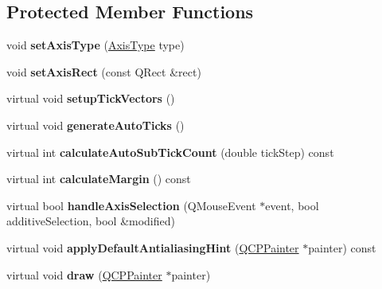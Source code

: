 \subsection*{Protected Member Functions}
\begin{DoxyCompactItemize}
\item 
\hypertarget{classQCPAxis_a3976dba7137c71a2a1a34737ff9baff9}{void {\bfseries set\-Axis\-Type} (\hyperlink{classQCPAxis_ae2bcc1728b382f10f064612b368bc18a}{Axis\-Type} type)}\label{classQCPAxis_a3976dba7137c71a2a1a34737ff9baff9}

\item 
\hypertarget{classQCPAxis_a0188c6248366fc9f9ff816dceee986e0}{void {\bfseries set\-Axis\-Rect} (const Q\-Rect \&rect)}\label{classQCPAxis_a0188c6248366fc9f9ff816dceee986e0}

\item 
\hypertarget{classQCPAxis_a57d9e961bae7d62f5b4e1f143e660c78}{virtual void {\bfseries setup\-Tick\-Vectors} ()}\label{classQCPAxis_a57d9e961bae7d62f5b4e1f143e660c78}

\item 
\hypertarget{classQCPAxis_a626eef437c874148df1a5ac78506d463}{virtual void {\bfseries generate\-Auto\-Ticks} ()}\label{classQCPAxis_a626eef437c874148df1a5ac78506d463}

\item 
\hypertarget{classQCPAxis_a3c5c045019fcdc0843a3e064eda7478a}{virtual int {\bfseries calculate\-Auto\-Sub\-Tick\-Count} (double tick\-Step) const }\label{classQCPAxis_a3c5c045019fcdc0843a3e064eda7478a}

\item 
\hypertarget{classQCPAxis_a10756afda0cd419fb24d09adb411dda7}{virtual int {\bfseries calculate\-Margin} () const }\label{classQCPAxis_a10756afda0cd419fb24d09adb411dda7}

\item 
\hypertarget{classQCPAxis_ac68d1c81004fded1f3c4ca95879a445d}{virtual bool {\bfseries handle\-Axis\-Selection} (Q\-Mouse\-Event $\ast$event, bool additive\-Selection, bool \&modified)}\label{classQCPAxis_ac68d1c81004fded1f3c4ca95879a445d}

\item 
\hypertarget{classQCPAxis_a13bde39eb1e0b7c14a02935689be8aba}{virtual void {\bfseries apply\-Default\-Antialiasing\-Hint} (\hyperlink{classQCPPainter}{Q\-C\-P\-Painter} $\ast$painter) const }\label{classQCPAxis_a13bde39eb1e0b7c14a02935689be8aba}

\item 
\hypertarget{classQCPAxis_a258b1e783eda5cd14ec5552c696a424e}{virtual void {\bfseries draw} (\hyperlink{classQCPPainter}{Q\-C\-P\-Painter} $\ast$painter)}\label{classQCPAxis_a258b1e783eda5cd14ec5552c696a424e}


\end{DoxyCompactItemize}
